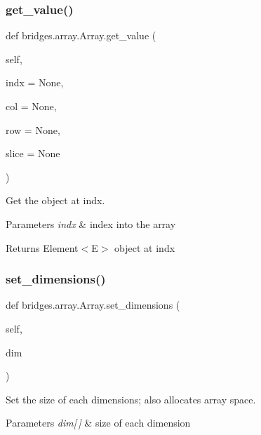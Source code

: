 \subsubsection{\texorpdfstring{get\+\_\+value()}{get\_value()}}
{\footnotesize\ttfamily def bridges.\+array.\+Array.\+get\+\_\+value (\begin{DoxyParamCaption}\item[{}]{self,  }\item[{}]{indx = {\ttfamily None},  }\item[{}]{col = {\ttfamily None},  }\item[{}]{row = {\ttfamily None},  }\item[{}]{slice = {\ttfamily None} }\end{DoxyParamCaption})}



Get the object at \textquotesingle{}indx\textquotesingle{}. 


\begin{DoxyParams}{Parameters}
{\em indx} & index into the array \\
\hline
\end{DoxyParams}
\begin{DoxyReturn}{Returns}
Element$<$\+E$>$ object at \textquotesingle{}indx\textquotesingle{} 
\end{DoxyReturn}
\mbox{\label{classbridges_1_1array_1_1_array_ad33c0cf22500f829d568b04b831549ec}} 
\subsubsection{\texorpdfstring{set\+\_\+dimensions()}{set\_dimensions()}}
{\footnotesize\ttfamily def bridges.\+array.\+Array.\+set\+\_\+dimensions (\begin{DoxyParamCaption}\item[{}]{self,  }\item[{}]{dim }\end{DoxyParamCaption})}



Set the size of each dimensions; also allocates array space. 


\begin{DoxyParams}{Parameters}
{\em dim\mbox{[}$\,$\mbox{]}} & size of each dimension \\
\hline
\end{DoxyParams}
\mbox{\label{classbridges_1_1array_1_1_array_a922bb185972d12221a1015cd9eef04ff}} 
